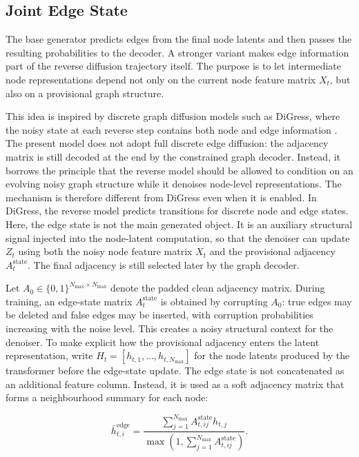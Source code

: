 \subsection{Joint Edge State}
\label{sec:generator:joint-edge-state}

The base generator predicts edges from the final node latents and then passes
the resulting probabilities to the decoder. A stronger variant makes edge
information part of the reverse diffusion trajectory itself. The purpose is to let
intermediate node representations depend not only on the current node feature
matrix \(X_t\), but also on a provisional graph structure.

This idea is inspired by discrete graph diffusion models such as DiGress, where
the noisy state at each reverse step contains both node and edge information
\citep{vignac2022digress}. The present model does not adopt full discrete edge
diffusion: the adjacency matrix is still decoded at the end by the constrained
graph decoder. Instead, it borrows the principle that the reverse model should
be allowed to condition on an evolving noisy graph structure while it denoises
node-level representations.
The mechanism is therefore different from DiGress even when it is enabled. In
DiGress, the reverse model predicts transitions for discrete node and edge
states. Here, the edge state is not the main generated object. It is an
auxiliary structural signal injected into the node-latent computation, so that
the denoiser can update \(Z_t\) using both the noisy node feature matrix
\(X_t\) and the provisional adjacency \(A_t^{\mathrm{state}}\). The final
adjacency is still selected later by the graph decoder.

Let \(A_0\in\{0,1\}^{N_{\max}\times N_{\max}}\) denote the padded clean
adjacency matrix. During training, an edge-state matrix
\(A_t^{\mathrm{state}}\) is obtained by corrupting \(A_0\): true edges may be
deleted and false edges may be inserted, with corruption probabilities
increasing with the noise level. This creates a noisy structural context for
the denoiser. To make explicit how the provisional adjacency enters the latent
representation, write \(H_t=[h_{t,1},\ldots,h_{t,N_{\max}}]\) for the node
latents produced by the transformer before the edge-state update. The edge
state is not concatenated as an additional feature column. Instead, it is used
as a soft adjacency matrix that forms a neighbourhood summary for each node:

\[
    \bar h^{\mathrm{edge}}_{t,i}
    =
    \frac{
        \sum_{j=1}^{N_{\max}}
        A^{\mathrm{state}}_{t,ij} h_{t,j}
    }{
        \max\left(1,\sum_{j=1}^{N_{\max}}
        A^{\mathrm{state}}_{t,ij}\right)
    }.
\]


